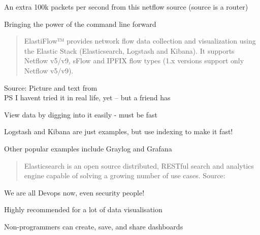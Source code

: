 \documentclass[Screen16to9,17pt]{foils}
\begin{document}


\centerline{An extra 100k packets per second from this netflow source (source is a router)}




\centerline{Bringing the power of the command line forward}




\begin{quote}
  ElastiFlow™ provides network flow data collection and visualization using the Elastic Stack (Elasticsearch, Logstash and Kibana). It supports Netflow v5/v9, sFlow and IPFIX flow types (1.x versions support only Netflow v5/v9).
\end{quote}
Source: Picture and text from  \\
PS I havent tried it in real life, yet -- but a friend has



\begin{list1}
\item View data by digging into it easily - must be fast
\item Logstash and Kibana are just examples, but use indexing to make it fast!
\item Other popular examples include Graylog and Grafana
\end{list1}



\begin{quote}
Elasticsearch is an open source distributed, RESTful search and analytics engine capable of solving a growing number of use cases. Source: 
\end{quote}

\begin{list2}
\item We are all Devops now, even security people!
\item Highly recommended for a lot of data visualisation
\item Non-programmers can create, save, and share dashboards
\end{list2}
\end{document}
